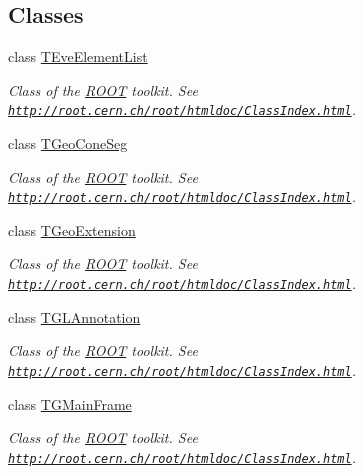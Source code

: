 \subsection*{Classes}
\begin{DoxyCompactItemize}
\item 
class \hyperlink{class_t_eve_element_list}{T\+Eve\+Element\+List}
\begin{DoxyCompactList}\small\item\em Class of the \hyperlink{namespace_r_o_o_t}{R\+O\+OT} toolkit. See \href{http://root.cern.ch/root/htmldoc/ClassIndex.html}{\tt http\+://root.\+cern.\+ch/root/htmldoc/\+Class\+Index.\+html}. \end{DoxyCompactList}\item 
class \hyperlink{class_t_geo_cone_seg}{T\+Geo\+Cone\+Seg}
\begin{DoxyCompactList}\small\item\em Class of the \hyperlink{namespace_r_o_o_t}{R\+O\+OT} toolkit. See \href{http://root.cern.ch/root/htmldoc/ClassIndex.html}{\tt http\+://root.\+cern.\+ch/root/htmldoc/\+Class\+Index.\+html}. \end{DoxyCompactList}\item 
class \hyperlink{class_t_geo_extension}{T\+Geo\+Extension}
\begin{DoxyCompactList}\small\item\em Class of the \hyperlink{namespace_r_o_o_t}{R\+O\+OT} toolkit. See \href{http://root.cern.ch/root/htmldoc/ClassIndex.html}{\tt http\+://root.\+cern.\+ch/root/htmldoc/\+Class\+Index.\+html}. \end{DoxyCompactList}\item 
class \hyperlink{class_t_g_l_annotation}{T\+G\+L\+Annotation}
\begin{DoxyCompactList}\small\item\em Class of the \hyperlink{namespace_r_o_o_t}{R\+O\+OT} toolkit. See \href{http://root.cern.ch/root/htmldoc/ClassIndex.html}{\tt http\+://root.\+cern.\+ch/root/htmldoc/\+Class\+Index.\+html}. \end{DoxyCompactList}\item 
class \hyperlink{class_t_g_main_frame}{T\+G\+Main\+Frame}
\begin{DoxyCompactList}\small\item\em Class of the \hyperlink{namespace_r_o_o_t}{R\+O\+OT} toolkit. See \href{http://root.cern.ch/root/htmldoc/ClassIndex.html}{\tt http\+://root.\+cern.\+ch/root/htmldoc/\+Class\+Index.\+html}. \end{DoxyCompactList}\item 

\end{DoxyCompactItemize}
